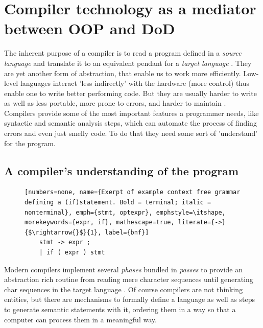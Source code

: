 \chapter{Compiler technology as a mediator between OOP and DoD}
The inherent purpose of a compiler is to read a program defined in a \textit{source language} and translate it to an equivalent pendant for a \textit{target language} . They are yet another form of abstraction, that enable us to work more efficiently. Low-level languages interact 'less indirectly' with the hardware (more control) thus enable one to write better performing code. But they are usually harder to write as well as less portable, more prone to errors, and harder to maintain .\\
Compilers provide some of the most important features a programmer needs, like syntactic and semantic analysis steps, which can automate the process of finding errors and even just smelly code. To do that they need some sort of 'understand' for the program.

\section{A compiler's understanding of the program}\label{compilers_understanding}
\begin{figure}
	\begin{lstlisting}[numbers=none, name={Exerpt of example context free grammar defining a (if)statement. Bold = terminal; italic = nonterminal}, emph={stmt, optexpr}, emphstyle=\itshape, morekeywords={expr, if}, mathescape=true, literate={->}{$\rightarrow{}$}{1}, label={bnf}]
	stmt -> expr ;
	| if ( expr ) stmt
	\end{lstlisting}
\end{figure}
Modern compilers implement several \textit{phases} bundled in \textit{passes} to provide an abstraction rich routine from reading mere character sequences until generating char sequences in the target language . Of course compilers are not thinking entities, but there are mechanisms to formally define a language as well as steps to generate semantic statements with it, ordering them in a way so that a computer can process them in a meaningful way.

